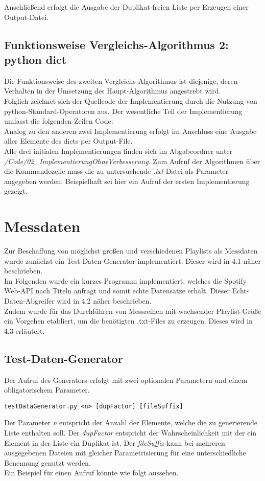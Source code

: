 \documentclass[
10pt, %
a4paper, %
oneside, %
headinclude,footinclude, %
BCOR5mm, %
]{scrartcl}
\begin{document}
Anschließend erfolgt die Ausgabe der Duplikat-freien Liste per Erzeugen einer Output-Datei.


\subsection{Funktionsweise Vergleichs-Algorithmus 2: python dict}
Die Funktionsweise des zweiten Vergleichs-Algorithmus ist diejenige, deren Verhalten in der Umsetzung des Haupt-Algorithmus angestrebt wird.\\
Folglich zeichnet sich der Quellcode der Implementierung durch die Nutzung von python-Standard-Operatoren aus. Der wesentliche Teil der Implementierung umfasst die folgenden Zeilen Code:\\

Analog zu den anderen zwei Implementierung erfolgt im Anschluss eine Ausgabe aller Elemente des dicts per Output-File.\\


Alle drei initialen Implementierungen finden sich im Abgabeordner unter \textit{/Code/02\_ImplementierungOhneVerbesserung}.
Zum Aufruf der Algorithmen über die Kommandozeile muss die zu untersuchende \textit{.txt}-Datei als Parameter angegeben werden. Beispielhaft sei hier ein Aufruf der ersten Implementierung gezeigt.




\section{Messdaten}
Zur Beschaffung von möglichst großen und verschiedenen Playlists als Messdaten wurde zunächst ein Test-Daten-Generator implementiert. Dieser wird in 4.1 näher beschrieben.\\
Im Folgenden wurde ein kurzes Programm implementiert, welches die Spotify Web-API nach Titeln anfragt und somit echte Datensätze erhält. Dieser Echt-Daten-Abgreifer wird in 4.2 näher beschrieben.\\
Zudem wurde für das Durchführen von Messreihen mit wachsender Playlist-Größe ein Vorgehen etabliert, um die benötigten .txt-Files zu erzeugen. Dieses wird in 4.3 erläutert.

\subsection{Test-Daten-Generator}

Der Aufruf des Generators erfolgt mit zwei optionalen Parametern und einem obligatorischem Parameter.
\begin{lstlisting}
testDataGenerator.py <n> [dupFactor] [fileSuffix]
\end{lstlisting}
Der Parameter \textit{n} entspricht der Anzahl der Elemente, welche die zu generierende Liste enthalten soll. Der \textit{dupFactor} entspricht der Wahrscheinlichkeit mit der ein Element in der Liste ein Duplikat ist. Der \textit{fileSuffix} kann bei mehreren ausgegebenen Dateien mit gleicher Parametrisierung für eine unterschiedliche Benennung genutzt werden.\\ 
Ein Beispiel für einen Aufruf könnte wie folgt aussehen.\\

\end{document}
